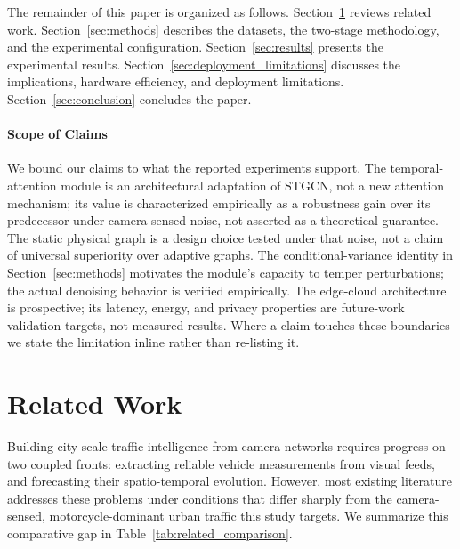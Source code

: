 \documentclass[a4paper,fleqn]{cas-sc}
\begin{document}
The remainder of this paper is organized as follows. Section~\ref{sec:related} reviews related work. Section~\ref{sec:methods} describes the datasets, the two-stage methodology, and the experimental configuration. Section~\ref{sec:results} presents the experimental results. Section~\ref{sec:deployment_limitations} discusses the implications, hardware efficiency, and deployment limitations. Section~\ref{sec:conclusion} concludes the paper.

\paragraph{Scope of Claims}
We bound our claims to what the reported experiments support. The temporal-attention module is an architectural adaptation of STGCN, not a new attention mechanism; its value is characterized empirically as a robustness gain over its predecessor under camera-sensed noise, not asserted as a theoretical guarantee. The static physical graph is a design choice tested under that noise, not a claim of universal superiority over adaptive graphs. The conditional-variance identity in Section~\ref{sec:methods} motivates the module's capacity to temper perturbations; the actual denoising behavior is verified empirically. The edge-cloud architecture is prospective; its latency, energy, and privacy properties are future-work validation targets, not measured results. Where a claim touches these boundaries we state the limitation inline rather than re-listing it.

\section{Related Work}
\label{sec:related}

Building city-scale traffic intelligence from camera networks requires progress on two coupled fronts: extracting reliable vehicle measurements from visual feeds, and forecasting their spatio-temporal evolution. However, most existing literature addresses these problems under conditions that differ sharply from the camera-sensed, motorcycle-dominant urban traffic this study targets. We summarize this comparative gap in Table~\ref{tab:related_comparison}.
\end{document}
